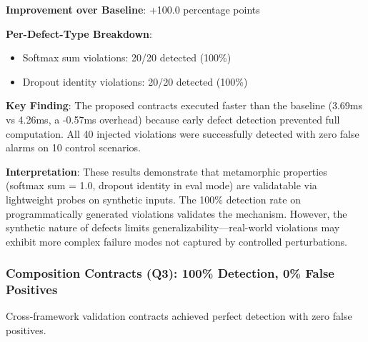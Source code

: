 \textbf{Improvement over Baseline}: +100.0 percentage points

\textbf{Per-Defect-Type Breakdown}:
\begin{itemize}
\item Softmax sum violations: 20/20 detected (100\%)
\item Dropout identity violations: 20/20 detected (100\%)
\end{itemize}

\textbf{Key Finding}: The proposed contracts executed faster than the baseline (3.69ms vs 4.26ms, a -0.57ms overhead) because early defect detection prevented full computation. All 40 injected violations were successfully detected with zero false alarms on 10 control scenarios.

\textbf{Interpretation}: These results demonstrate that metamorphic properties (softmax sum = 1.0, dropout identity in eval mode) are validatable via lightweight probes on synthetic inputs. The 100\% detection rate on programmatically generated violations validates the mechanism. However, the synthetic nature of defects limits generalizability---real-world violations may exhibit more complex failure modes not captured by controlled perturbations.

\subsubsection{Composition Contracts (Q3): 100\% Detection, 0\% False Positives}

Cross-framework validation contracts achieved perfect detection with zero false positives.

\begin{table}[htbp]
\centering
{}
\end{table}

